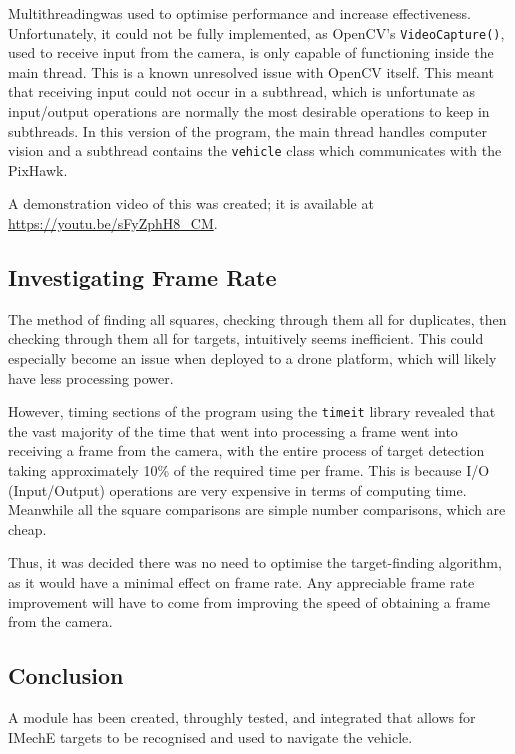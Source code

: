 \documentclass[11pt,twoside]{article}
\begin{document}
Multithreading\footnotemark was used to optimise performance and increase effectiveness. Unfortunately, it could not be fully implemented, as OpenCV's \lstinline|VideoCapture()|, used to receive input from the camera, is only capable of functioning inside the main thread. This is a known unresolved issue with OpenCV itself. This meant that receiving input could not occur in a subthread, which is unfortunate as input/output operations are normally the most desirable operations to keep in subthreads. In this version of the program, the main thread handles computer vision and a subthread contains the \lstinline|vehicle| class which communicates with the PixHawk. \label{OpenCV_multithreading_issues}

A demonstration video of this was created; it is available at \url{https://youtu.be/sFyZphH8_CM}.

\subsection{Investigating Frame Rate}
The method of finding all squares, checking through them all for duplicates, then checking through them all for targets, intuitively seems inefficient. This could especially become an issue when deployed to a drone platform, which will likely have less processing power.

However, timing sections of the program using the \lstinline|timeit| library revealed that the vast majority of the time that went into processing a frame went into receiving a frame from the camera, with the entire process of target detection taking approximately 10\% of the required time per frame. This is because I/O (Input/Output) operations are very expensive in terms of computing time. Meanwhile all the square comparisons are simple number comparisons, which are cheap.

Thus, it was decided there was no need to optimise the target-finding algorithm, as it would have a minimal effect on frame rate. Any appreciable frame rate improvement will have to come from improving the speed of obtaining a frame from the camera.

\subsection{Conclusion}
A module has been created, throughly tested, and integrated that allows for IMechE targets to be recognised and used to navigate the vehicle.
\end{document}

